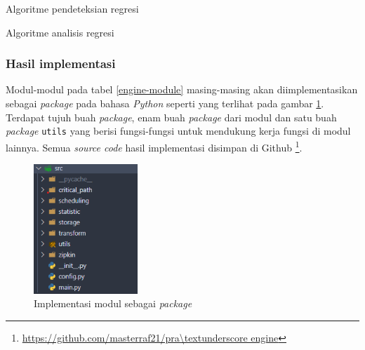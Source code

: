 \begin{algorithm}[hbt!]
	
	\BlankLine
	
	
	\caption{Algoritme pendeteksian regresi}\label{alg:regression-detection}
\end{algorithm}
\begin{algorithm}[hbt!]
	
	
	
	
	\caption{Algoritme analisis regresi}\label{alg:regression-analysis}
\end{algorithm}


\subsubsection{Hasil implementasi}
Modul-modul pada tabel \ref{engine-module} masing-masing akan diimplementasikan sebagai \textit{package} pada bahasa \textit{Python} seperti yang terlihat pada gambar \ref{package}. Terdapat tujuh buah \textit{package}, enam buah \textit{package} dari modul dan satu buah \textit{package} \texttt{utils} yang berisi fungsi-fungsi untuk mendukung kerja fungsi di modul lainnya. Semua \textit{source code} hasil implementasi disimpan di Github \footnote{\url{https://github.com/masterraf21/pra\textunderscore engine}}.
\begin{figure}[!htb]
	\centering
	\includegraphics[width=0.35\textwidth]{resources/ch4/packages.png}
	\caption{Implementasi modul sebagai \textit{package}}
	\label{package}
\end{figure} 

